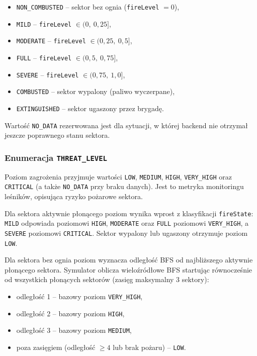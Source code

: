 \begin{itemize}
    \item \texttt{NON\_COMBUSTED} -- sektor bez ognia (\texttt{fireLevel} $= 0$),
    \item \texttt{MILD} -- \texttt{fireLevel} $\in (0,\ 0{,}25]$,
    \item \texttt{MODERATE} -- \texttt{fireLevel} $\in (0{,}25,\ 0{,}5]$,
    \item \texttt{FULL} -- \texttt{fireLevel} $\in (0{,}5,\ 0{,}75]$,
    \item \texttt{SEVERE} -- \texttt{fireLevel} $\in (0{,}75,\ 1{,}0]$,
    \item \texttt{COMBUSTED} -- sektor wypalony (paliwo wyczerpane),
    \item \texttt{EXTINGUISHED} -- sektor ugaszony przez brygadę.
\end{itemize}

Wartość \texttt{NO\_DATA} rezerwowana jest dla sytuacji, w której backend nie otrzymał jeszcze poprawnego stanu sektora.

\subsubsection*{Enumeracja \texttt{THREAT\_LEVEL}}

Poziom zagrożenia przyjmuje wartości \texttt{LOW}, \texttt{MEDIUM}, \texttt{HIGH}, \texttt{VERY\_HIGH} oraz \texttt{CRITICAL} (a także \texttt{NO\_DATA} przy braku danych). Jest to metryka monitoringu leśników, opisująca ryzyko pożarowe sektora.

Dla sektora aktywnie płonącego poziom wynika wprost z klasyfikacji \texttt{fireState}: \texttt{MILD} odpowiada poziomowi \texttt{HIGH}, \texttt{MODERATE} oraz \texttt{FULL} poziomowi \texttt{VERY\_HIGH}, a \texttt{SEVERE} poziomowi \texttt{CRITICAL}. Sektor wypalony lub ugaszony otrzymuje poziom \texttt{LOW}.

Dla sektora bez ognia poziom wyznacza odległość BFS od najbliższego aktywnie płonącego sektora. Symulator oblicza wieloźródłowe BFS startując równocześnie od wszystkich płonących sektorów (zasięg maksymalny 3 sektory):

\begin{itemize}
    \item odległość 1 -- bazowy poziom \texttt{VERY\_HIGH},
    \item odległość 2 -- bazowy poziom \texttt{HIGH},
    \item odległość 3 -- bazowy poziom \texttt{MEDIUM},
    \item poza zasięgiem (odległość $\geq 4$ lub brak pożaru) -- \texttt{LOW}.
\end{itemize}

